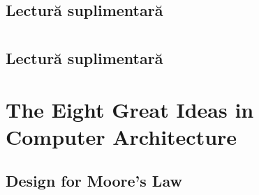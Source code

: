 \documentclass[a4paper,10pt]{article}
\begin{document}
\subsection{}

\subsection{}

\subsection{Lectură suplimentară}


\section{}
\subsection{}

\subsection{}

\subsection{}

\subsection{Lectură suplimentară}

\section{The Eight Great Ideas in Computer Architecture}

\subsection{Design for Moore's Law}
\end{document}
